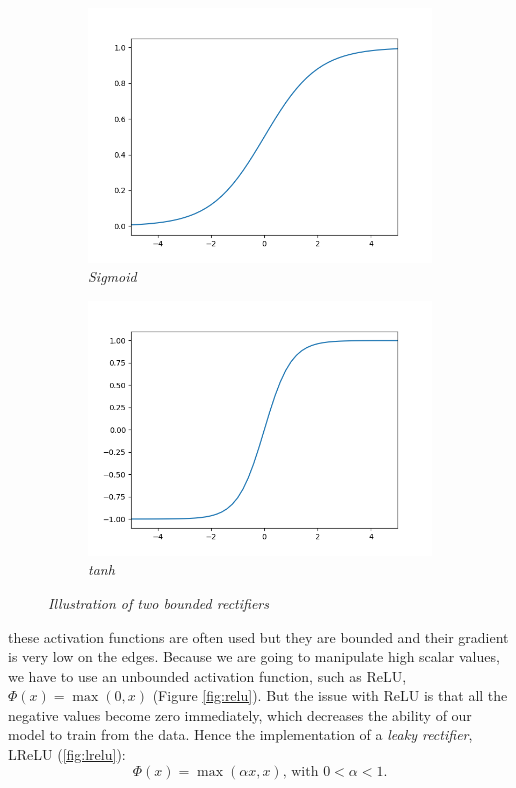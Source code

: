 \documentclass{article}
\begin{document}
            \begin{figure}[!ht]
                \begin{subfigure}{.49\linewidth}
                    \centering
                    \includegraphics[width=.9\linewidth]{pics/act-sigmoid.png}
                    \caption{\textit{Sigmoid}}
                \end{subfigure}
                \begin{subfigure}{.49\linewidth}
                    \centering
                    \includegraphics[width=.9\linewidth]{pics/act-tanh.png}
                    \caption{\textit{tanh}}
                \end{subfigure}
                \caption{\textit{Illustration of two bounded rectifiers}}
                \label{fig:act-sigmoids}
            \end{figure}

            these activation functions are often used but they are bounded and their gradient is very low on the edges. Because we are going to manipulate high scalar values, we have to use an unbounded activation function, such as ReLU, $\Phi(x)=\max(0,x)$ (Figure \ref{fig:relu}). But the issue with ReLU is that all the negative values become zero immediately, which decreases the ability of our model to train from the data. Hence the implementation of a \textit{leaky rectifier}, LReLU (\ref{fig:lrelu}):
            $$\Phi(x)=\max(\alpha x,x)\mbox{, with } 0<\alpha<1.$$
\end{document}
